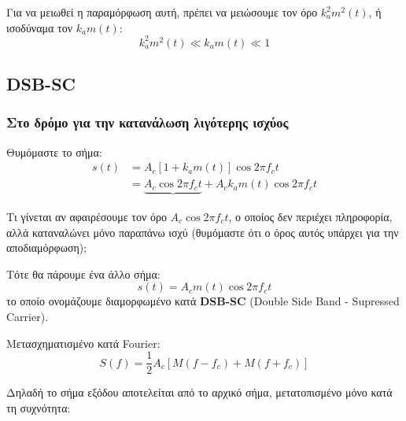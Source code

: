 \documentclass[11pt,a4paper,notitlepage,fleqn,final]{article}
\begin{document}
Για να μειωθεί η παραμόρφωση αυτή, πρέπει να μειώσουμε τον όρο \( k_a^2m^2(t) \), ή ισοδύναμα
τον \( k_a m(t) \):
\[
k_a^2m^2(t) \ll k_am(t) \ll 1
\]

\subsection{DSB-SC}
\label{dsb-sc}
\subsubsection{Στο δρόμο για την κατανάλωση λιγότερης ισχύος}
Θυμόμαστε το σήμα:
\begin{align*}
	s(t) &=
	A_c\left[1+k_a m(t)\right]\cos 2πf_c t
	\\
	&= \underbrace{A_c \cos 2π f_c t} + A_c k_a m(t) \cos 2π f_c t
\end{align*}

Τι γίνεται αν αφαιρέσουμε τον όρο \( A_c \cos 2πf_c t \), ο οποίος
δεν περιέχει πληροφορία, αλλά καταναλώνει μόνο παραπάνω ισχύ (θυμόμαστε
ότι ο όρος αυτός υπάρχει για την αποδιαμόρφωση);

Τότε θα πάρουμε ένα άλλο σήμα:
\[
\boxed{s(t) = A_c m(t) \cos 2π f_c t}
\]
το οποίο ονομάζουμε διαμορφωμένο κατά \textbf{DSB-SC} (Double Side Band - Supressed Carrier).

Μετασχηματισμένο κατά Fourier:
\[
S(f) =
\frac{1}{2} A_c \left[
M(f-f_c) + M(f+f_c)
\right]
\]

Δηλαδή το σήμα εξόδου αποτελείται από το αρχικό σήμα, μετατοπισμένο
μόνο κατά τη συχνότητα:

\begin{center}
\end{center}
\end{document}
